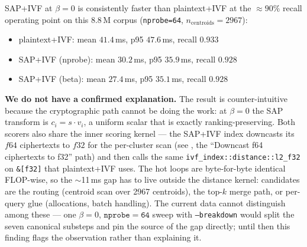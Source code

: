 SAP+IVF at $\beta{=}0$ is consistently faster than plaintext+IVF at
the $\approx\!90\%$ recall operating point on this 8.8\,M corpus
(\texttt{nprobe=64}, $n_\text{centroids}{=}2967$):

\begin{itemize}\setlength{\itemsep}{0pt}
  \item plaintext+IVF:    mean $41.4$\,ms, p95 $47.6$\,ms, recall $0.933$
  \item SAP+IVF (nprobe): mean $30.2$\,ms, p95 $35.9$\,ms, recall $0.928$
  \item SAP+IVF (beta):   mean $27.4$\,ms, p95 $35.1$\,ms, recall $0.928$
\end{itemize}

\textbf{We do not have a confirmed explanation.} The result is
counter-intuitive because the cryptographic path cannot be doing the
work: at $\beta{=}0$ the SAP transform is $c_i = s\!\cdot\!v_i$, a
uniform scalar that is exactly ranking-preserving. Both scorers also
share the inner scoring kernel --- the SAP+IVF index downcasts its
$f64$ ciphertexts to $f32$ for the per-cluster scan (see
, the ``Downcast f64 ciphertexts to f32''
path) and then calls the same \texttt{ivf\_index::distance::l2\_f32}
on \texttt{\&[f32]} that plaintext+IVF uses. The hot loops are
byte-for-byte identical FLOP-wise, so the $\sim$11\,ms gap has to
live outside the distance kernel: candidates are the routing
(centroid scan over 2967 centroids), the top-$k$ merge path, or
per-query glue (allocations, batch handling). The current data
cannot distinguish among these --- one $\beta{=}0$,
$\mathtt{nprobe=64}$ sweep with \texttt{--breakdown} would split the
seven canonical substeps and pin the source of the gap directly;
until then this finding flags the observation rather than explaining
it.
